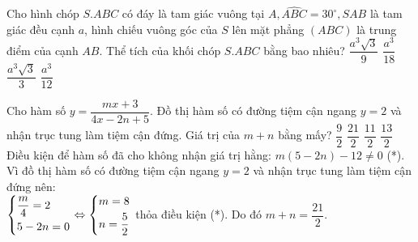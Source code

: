 \begin{ex}%
Cho hình chóp $S.ABC$ có đáy là tam giác vuông tại $A, \widehat{ABC} = 30^\circ, SAB$ là tam giác đều cạnh $a$, hình chiếu vuông góc của $S$ lên mặt phẳng $(ABC)$ là trung điểm của cạnh $AB$. Thể tích của khối chóp $S.ABC$ bằng bao nhiêu?
 \choice
  { $\dfrac{a^3 \sqrt{3} }{9}$}
  { $\dfrac{a^3 }{18}$}
  { $\dfrac{a^3 \sqrt{3} }{3}$}
  { \True $\dfrac{a^3 }{12}$}
 \loigiai
  {
  {
  }
  }
\end{ex}


\begin{ex}%
Cho hàm số $y = \dfrac{mx+3}{4x-2n+5}$. Đồ thị hàm số có đường tiệm cận ngang $y = 2$ và nhận trục tung làm tiệm cận đứng. Giá trị của $m + n$ bằng mấy?
 \choice
  { $\dfrac{9}{2}$}
  { \True $\dfrac{21}{2}$}
  { $\dfrac{11}{2}$}
  { $\dfrac{13}{2}$}
 \loigiai
  {
  Điều kiện để hàm số đã cho không nhận giá trị hằng: $m(5-2n)-12 \ne 0 $ (*).\\
  Vì đồ thị hàm số có đường tiệm cận ngang $y = 2$ và nhận trục tung làm tiệm cận đứng nên:\\
  $\left\{\begin{aligned}& \dfrac{m}{4}=2 \\& 5-2n=0\end{aligned}\right. \Leftrightarrow \left\{\begin{aligned}& m=8 \\& n= \dfrac{5}{2}\end{aligned}\right.$ thỏa điều kiện (*). Do đó $m + n = \dfrac{21}{2}$.
  }
\end{ex}


